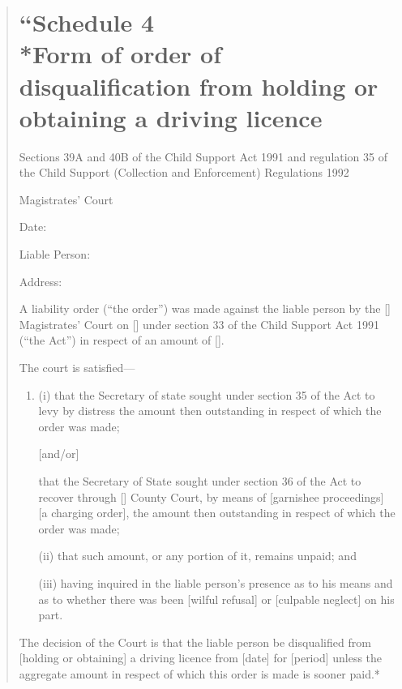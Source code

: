 \documentclass[12pt,a4paper]{article}
\begin{document}
\begin{quotation}
\noindent
\part*{``Schedule 4\\*Form of order of disqualification from holding or obtaining a driving licence}

\noindent
Sections 39A and 40B of the Child Support Act 1991 and regulation 35 of the Child Support (Collection and Enforcement) Regulations 1992

\medskip

{\raggedleft \hspace{0.5\linewidth}\dotfill Magistrates' Court

}

\medskip

Date:

\medskip

Liable Person:

\medskip

Address:

\medskip

A liability order (``the order'') was made against the liable person by the [\phantom{Bolton}] Magistrates' Court on [\phantom{\today}] under section 33 of the Child Support Act 1991 (``the Act'') in respect of an amount of [\phantom{£100.00}].

The court is satisfied---
\begin{enumerate}
\item[]
(i) that the Secretary of state sought under section 35 of the Act to levy by distress the amount then outstanding in respect of which the order was made;

[and/or]

that the Secretary of State sought under section 36 of the Act to recover through [\phantom{Bolton}] County Court, by means of [garnishee proceedings] [a charging order], the amount then outstanding in respect of which the order was made;

(ii) that such amount, or any portion of it, remains unpaid; and

(iii) having inquired in the liable person's presence as to his means and as to whether there was been [wilful refusal] or [culpable neglect] on his part.
\end{enumerate}

The decision of the Court is that the liable person be disqualified from [holding or obtaining] a driving licence from [date] for [period] unless the aggregate amount in respect of which this order is made is sooner paid.*


\end{quotation}
\end{document}
